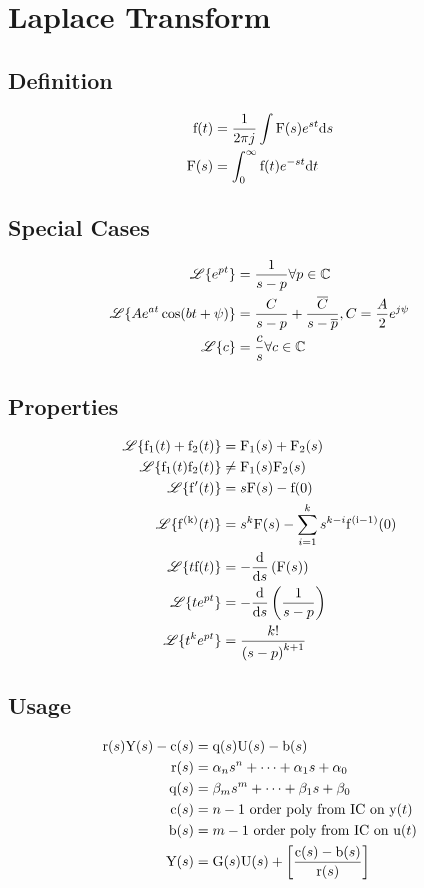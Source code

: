 \section*{Laplace Transform}
\subsection*{Definition}
\begin{align*}
    \func{f}[t] &= \frac{1}{2 \pi j} \intidef{\func{F}[s] e^{st}}[s] \\
    \func{F}[s] &= \intdef{0}{\infty}{\func{f}[t] e^{-st}}{t}
\end{align*}

\subsection*{Special Cases}
\begin{align*}
    \laplace{e^{pt}} &= \frac{1}{s-p} \forall p \in \mathbb{C} \\
    \laplace{Ae^{at}\cos{bt+\psi}} &= \frac{C}{s-p}+\frac{\overline{C}}{s-\overline{p}}, C = \frac{A}{2}e^{j\psi} \\
    \laplace{c} &= \frac{c}{s} \forall c \in \mathbb{C}
\end{align*}

\subsection*{Properties}
\begin{align*}
    \laplace{\func{f_1}[t] + \func{f_2}[t]} &= \func{F_1}[s]+\func{F_2}[s] \\
    \laplace{\func{f_1}[t]\func{f_2}[t]} &\neq \func{F_1}[s]\func{F_2}[s] \\
    \laplace{\func{f'}[t]} &= s \func{F}[s] - \func{f}[0] \\
    \laplace{\func{f^{(k)}}[t]} &= s^{k} \func{F}[s] - \sum_{i=1}^{k} s^{k-i}\func{f^{(i-1)}}[0] \\
    \laplace{t \func{f}[t]} &= -\deriv{s}{\func{F}[s]} \\
    \laplace{t e^{pt}} &= -\deriv{s}{\frac{1}{s-p}} \\
    \laplace{t^{k} e^{pt}} &= \frac{k!}{{(s-p)}^{k+1}}
\end{align*}

\subsection*{Usage}
\begin{align*}
    \func{r}[s]\func{Y}[s]-\func{c}[s] &= \func{q}[s]\func{U}[s]-\func{b}[s] \\
    \func{r}[s] &= \alpha_n s^n + \cdots + \alpha_1 s + \alpha_0 \\
    \func{q}[s] &= \beta_m s^m + \cdots + \beta_1 s + \beta_0 \\
    \func{c}[s] &= n-1 \text{ order poly from IC on } \func{y}[t] \\
    \func{b}[s] &= m-1 \text{ order poly from IC on } \func{u}[t] \\
    \func{Y}[s] &= \func{G}[s]\func{U}[s]+\left[\frac{\func{c}[s]-\func{b}[s]}{\func{r}[s]}\right]
\end{align*}
